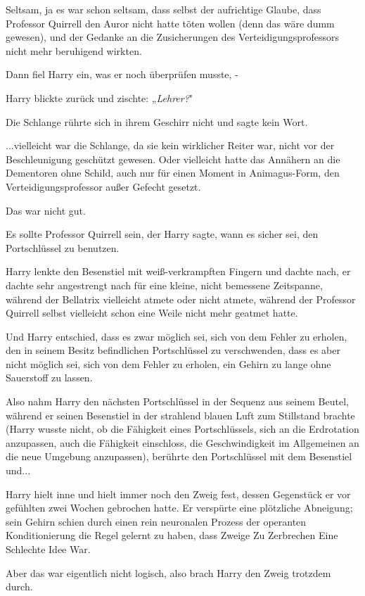 {Seltsam, ja es war schon seltsam, dass selbst der aufrichtige Glaube, dass Professor Quirrell den Auror nicht hatte töten wollen (denn das wäre dumm gewesen), und der Gedanke an die Zusicherungen des Verteidigungsprofessors nicht mehr beruhigend wirkten.

Dann fiel Harry ein, was er noch überprüfen musste, -

Harry blickte zurück und zischte: „\emph{Lehrer?}"

Die Schlange rührte sich in ihrem Geschirr nicht und sagte kein Wort.

...vielleicht war die Schlange, da sie kein wirklicher Reiter war, nicht vor der Beschleunigung geschützt gewesen. Oder vielleicht hatte das Annähern an die Dementoren ohne Schild, auch nur für einen Moment in Animagus-Form, den Verteidigungsprofessor außer Gefecht gesetzt.

Das war nicht gut.

Es sollte Professor Quirrell sein, der Harry sagte, wann es sicher sei, den Portschlüssel zu benutzen.

Harry lenkte den Besenstiel mit weiß-verkrampften Fingern und dachte nach, er dachte sehr angestrengt nach für eine kleine, nicht bemessene Zeitspanne, während der Bellatrix vielleicht atmete oder nicht atmete, während der Professor Quirrell selbst vielleicht schon eine Weile nicht mehr geatmet hatte.

Und Harry entschied, dass es zwar möglich sei, sich von dem Fehler zu erholen, den in seinem Besitz befindlichen Portschlüssel zu verschwenden, dass es aber nicht möglich sei, sich von dem Fehler zu erholen, ein Gehirn zu lange ohne Sauerstoff zu lassen.

Also nahm Harry den nächsten Portschlüssel in der Sequenz aus seinem Beutel, während er seinen Besenstiel in der strahlend blauen Luft zum Stillstand brachte (Harry wusste nicht, ob die Fähigkeit eines Portschlüssels, sich an die Erdrotation anzupassen, auch die Fähigkeit einschloss, die Geschwindigkeit im Allgemeinen an die neue Umgebung anzupassen), berührte den Portschlüssel mit dem Besenstiel und...

Harry hielt inne und hielt immer noch den Zweig fest, dessen Gegenstück er vor gefühlten zwei Wochen gebrochen hatte. Er verspürte eine plötzliche Abneigung; sein Gehirn schien durch einen rein neuronalen Prozess der operanten Konditionierung die Regel gelernt zu haben, dass Zweige Zu Zerbrechen Eine Schlechte Idee War.

Aber das war eigentlich nicht logisch, also brach Harry den Zweig trotzdem durch.

}
